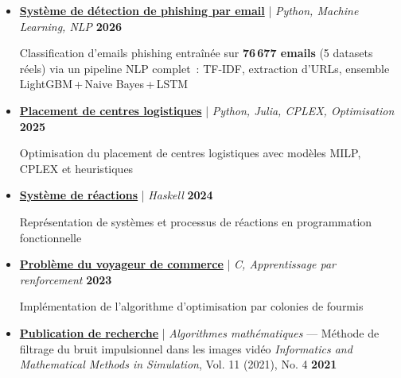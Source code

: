 \documentclass[10pt,english,french]{article}
\begin{document}
\vspace{-7pt}
\begin{itemize}[leftmargin=0.5cm, label=\textbullet, itemsep=0.2em]
    \item \href{https://github.com/DmytroPalahin/phishing-email-detection}{\textbf{Système de détection de phishing par email}} | \textit{Python, Machine Learning, NLP} \hfill \textbf{2026}

          Classification d'emails phishing entraînée sur \textbf{76\,677 emails} (5 datasets réels) via
          un pipeline NLP complet~: TF-IDF, extraction d'URLs, ensemble LightGBM\,+\,Naive Bayes\,+\,LSTM

    \item \href{https://github.com/DmytroPalahin/logistics-center-placement}{\textbf{Placement de centres logistiques}} | \textit{Python, Julia, CPLEX, Optimisation} \hfill \textbf{2025}

          Optimisation du placement de centres logistiques avec modèles MILP, CPLEX et heuristiques

    \item \href{https://github.com/DmytroPalahin/hsReact}{\textbf{Système de réactions}} | \textit{Haskell} \hfill \textbf{2024}

          Représentation de systèmes et processus de réactions en programmation fonctionnelle

    \item \href{https://github.com/DmytroPalahin/Probleme_du_Voyageur_de_Commerce}{\textbf{Problème du voyageur de commerce}} | \textit{C, Apprentissage par renforcement} \hfill \textbf{2023}

          Implémentation de l'algorithme d'optimisation par colonies de fourmis

    \item \href{https://www.researchsquare.com/article/rs-2203260/v1}{\textbf{Publication de recherche}} | \textit{Algorithmes mathématiques} --- Méthode de filtrage du bruit impulsionnel dans les images vidéo \textit{Informatics and Mathematical Methods in Simulation}, Vol. 11 (2021), No. 4 \hfill \textbf{2021}


\end{itemize}
\end{document}
